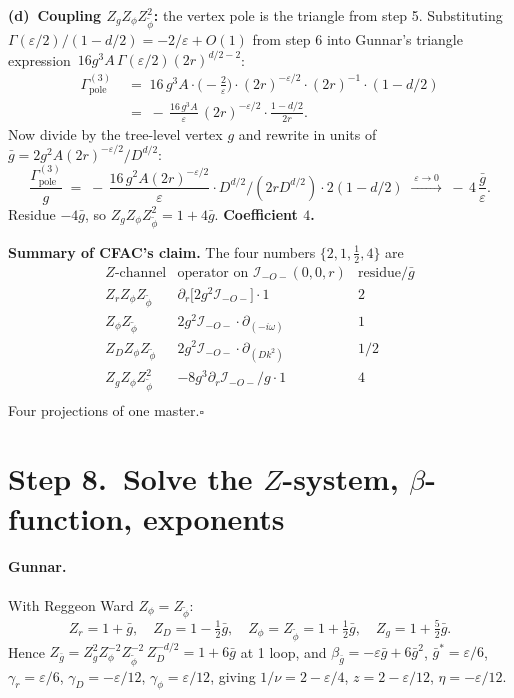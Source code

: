 \documentclass[11pt,a4paper]{article}
\begin{document}
\begin{cfacbox}
\smallskip
\noindent\textbf{(d)\ Coupling $Z_{g}Z_{\phi}Z_{\widetilde\phi}^{2}$:} the vertex pole is
the triangle from step 5. Substituting $\Gamma(\varepsilon/2)/(1-d/2) = -2/\varepsilon + O(1)$
from step 6 into Gunnar's triangle expression
$\,16 g^{3} A\,\Gamma(\varepsilon/2)(2r)^{d/2-2}$:
\begin{align*}
\Gamma^{(3)}_{\text{pole}}
&\;=\; 16\,g^{3} A \cdot \bigl(-\tfrac{2}{\varepsilon}\bigr)\!\cdot (2r)^{-\varepsilon/2}\!\cdot(2r)^{-1}\cdot(1-d/2) \\
&\;=\; -\,\frac{16\,g^{3} A}{\varepsilon}\,(2r)^{-\varepsilon/2}\cdot\frac{1-d/2}{2r}.
\end{align*}
Now divide by the tree-level vertex $g$ and rewrite in units of
$\bar g = 2 g^{2} A(2r)^{-\varepsilon/2}/D^{d/2}$:
\[
\frac{\Gamma^{(3)}_{\text{pole}}}{g}
\;=\; -\,\frac{16\,g^{2}A(2r)^{-\varepsilon/2}}{\varepsilon}\cdot D^{d/2}/(2 r D^{d/2}) \cdot 2(1-d/2)
\;\xrightarrow{\;\varepsilon\to 0\;}\;
-\,4\,\frac{\bar g}{\varepsilon}.
\]
Residue $-4\bar g$, so $Z_{g}Z_{\phi}Z_{\widetilde\phi}^{2} = 1 + 4\bar g$.
\textbf{Coefficient $\boxed{4}$.}

\smallskip
\textbf{Summary of CFAC's claim.} The four numbers $\{2,1,\tfrac{1}{2},4\}$ are
\[
\begin{array}{l|c|c}
Z\text{-channel} & \text{operator on }\mathcal I_{-O-}(0,0,r) & \text{residue}/\bar g \\
\hline
Z_{r}Z_{\phi}Z_{\widetilde\phi} & \partial_{r}\bigl[2g^{2}\mathcal I_{-O-}\bigr]\cdot\!1 & 2 \\
Z_{\phi}Z_{\widetilde\phi}      & 2g^{2}\mathcal I_{-O-}\cdot \partial_{(-i\omega)} & 1 \\
Z_{D}Z_{\phi}Z_{\widetilde\phi} & 2g^{2}\mathcal I_{-O-}\cdot \partial_{(Dk^{2})} & 1/2 \\
Z_{g}Z_{\phi}Z_{\widetilde\phi}^{2} & -8g^{3}\partial_{r}\mathcal I_{-O-}/g\cdot\!1 & 4 \\
\end{array}
\]
Four projections of one master.\hfill$\square$
\end{cfacbox}

\section*{Step 8.\ Solve the $Z$-system, $\beta$-function, exponents}

\paragraph{Gunnar.} With Reggeon Ward $Z_{\phi}=Z_{\widetilde\phi}$:
\[
Z_{r} = 1+\bar g,\quad Z_{D} = 1-\tfrac{1}{2}\bar g,\quad
Z_{\phi} = Z_{\widetilde\phi} = 1+\tfrac{1}{2}\bar g,\quad Z_{g} = 1+\tfrac{5}{2}\bar g.
\]
Hence $Z_{\bar g} = Z_{g}^{2}Z_{\phi}^{-2}Z_{\widetilde\phi}^{-2}\,Z_{D}^{-d/2} = 1 + 6\bar g$ at
1 loop, and $\beta_{\bar g} = -\varepsilon\bar g + 6\bar g^{2}$, $\bar g^{*}=\varepsilon/6$,
$\gamma_{r}=\varepsilon/6$, $\gamma_{D}=-\varepsilon/12$, $\gamma_{\phi}=\varepsilon/12$,
giving $1/\nu = 2-\varepsilon/4$, $z=2-\varepsilon/12$, $\eta=-\varepsilon/12$.
\end{document}
